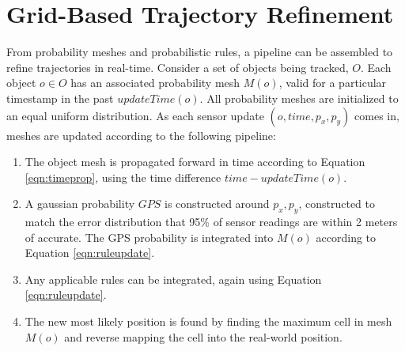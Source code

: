 

\section{Grid-Based Trajectory Refinement}

From probability meshes and probabilistic rules, a pipeline can be assembled to refine trajectories in real-time. Consider a set of objects being tracked, $O$.
Each object $o \in O$ has an associated probability mesh $M(o)$, valid for a particular timestamp in the past $updateTime(o)$. All probability meshes are initialized to an equal uniform distribution.
As each sensor update $(o, \mathit{time}, p_x, p_y)$ comes in, meshes are updated according to the following pipeline:

\begin{enumerate}

\item The object mesh is propagated forward in time according to Equation \ref{eqn:timeprop}, using the time difference $\textit{time} - \textit{updateTime}(o)$.

\item A gaussian probability $\textit{GPS}$ is constructed around $p_x, p_y$, constructed to match the error distribution that 95\% of sensor readings are within 2 meters of accurate. The GPS probability is integrated into $M(o)$ according to Equation \ref{eqn:ruleupdate}.

\item Any applicable rules can be integrated, again using Equation \ref{eqn:ruleupdate}.

\item The new most likely position is found by finding the maximum cell in mesh $M(o)$ and reverse mapping the cell into the real-world position.

\end{enumerate}


